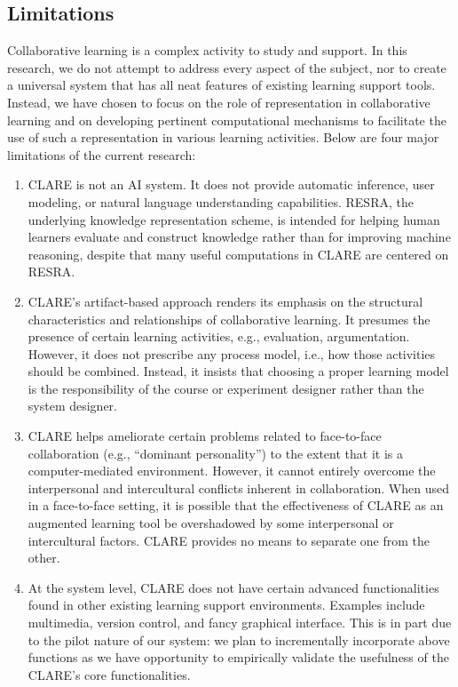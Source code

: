 \subsection{Limitations}
\label{sec:limitations}

Collaborative learning is a complex activity to study and support. In this
research, we do not attempt to address every aspect of the subject, nor to
create a universal system that has all neat features of existing learning
support tools. Instead, we have chosen to focus on the role of
representation in collaborative learning and on developing pertinent
computational mechanisms to facilitate the use of such a representation in
various learning activities.  Below are four major limitations of the current
research:

\begin{enumerate}
\item CLARE is not an AI system. It does not provide automatic inference,
  user modeling, or natural language understanding capabilities. RESRA, the
  underlying knowledge representation scheme, is intended for helping
  human learners evaluate and construct knowledge rather than for improving
  machine reasoning, despite that many useful computations in CLARE are
  centered on RESRA.
  
\item CLARE's artifact-based approach renders its emphasis on the
  structural characteristics and relationships of collaborative learning.
  It presumes the presence of certain learning activities, e.g.,
  evaluation, argumentation. However, it does not prescribe any process
  model, i.e., how those activities should be combined.  Instead, it
  insists that choosing a proper learning model is the responsibility of
  the course or experiment designer rather than the system designer.
  
\item CLARE helps ameliorate certain problems related to face-to-face
  collaboration (e.g., ``dominant personality'') to the extent that it is a
  computer-mediated environment. However, it cannot entirely overcome the
  interpersonal and intercultural conflicts inherent in collaboration. When
  used in a face-to-face setting, it is possible that the effectiveness of
  CLARE as an augmented learning tool be overshadowed by some interpersonal
  or intercultural factors. CLARE provides no means to separate one from the
  other.
  
\item At the system level, CLARE does not have certain advanced
  functionalities found in other existing learning support environments.
  Examples include multimedia, version control, and fancy graphical
  interface. This is in part due to the pilot nature of our system: we plan
  to incrementally incorporate above functions as we have opportunity to
  empirically validate the usefulness of the CLARE's core functionalities.
\end{enumerate}











